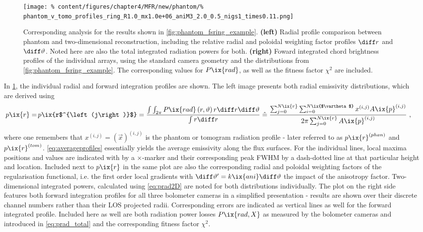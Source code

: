 %
           \begin{figure}[t]%
               \centering%
               \texttt{[image: \%
                   content/figures/chapter4/MFR/new/phantom/\%
                   phantom\_v\_tomo\_profiles\_ring\_R1.0\_mx1.0e+06\_aniM3\_2.0\_0.5\_nigs1\_times0.11.png]}%
               \caption{Corresponding analysis for the results shown in \cref{fig:phantom_fsring_example}. \textbf{(left)} Radial profile comparison between phantom and two-dimensional reconstruction, including the relative radial and poloidal weighting factor profiles $\diff r$ and $\diff\vartheta$. Noted here are also the total integrated radiation powers for both. \textbf{(right)} Foward integrated chord brightness profiles of the individual arrays, using the standard camera geometry and the distributions from \cref{fig:phantom_fsring_example}. The corresponding values for $P\ix{rad}$, as well as the fitness factor $\chi^2$ are included.}\label{fig:phantom_fsring_example_profiles}%
           \end{figure}%
%
           In \cref{fig:phantom_fsring_example_profiles}, the individual radial and forward integration profiles are shown. The left image presents both radial emissivity distributions, which are derived using%
%
           \begin{align}%
                p\ix{r}=\,&p\ix{r$^{\left(j\right)}$}=%
                \frac{\int\int_{2\pi}P\ix{rad}\left(r,\vartheta\right)r\diff r\diff\vartheta}{\int r\diff r}%
                \mathrel{\hat{=}}%
                \frac{\sum_{j=0}^{N\ix{r}}\sum_{i=0}^{N\ix{$\vartheta$}}x^{\left(i,j\right)}A\ix{p}^{\left(i,j\right)}}{%
                    2\pi\sum_{j=0}^{N\ix{r}}A\ix{p}^{\left(i,j\right)}}\,\,,\label{eq:averageprofiles}%
           \end{align}%
%
           where one remembers that $x^{\left(i,j\right)}=\left(\vec{x}\right)^{\left(i,j\right)}$ is the phantom or tomogram radiation profile - later referred to as $p\ix{r}^{\left(phan\right)}$ and $p\ix{r}^{\left(tom\right)}$. \autoref{eq:averageprofiles} essentially yields the average emissivity along the flux surfaces. For the individual lines, local maxima positions and values are indicated with by a $\times$-marker and their corresponding peak FWHM by a dash-dotted line at that particular height and location. Included next to $p\ix{r}$ in the same plot are also the corresponding radial and poloidal weighting factors of the regularisation functional, i.e. the first order local gradients with $\diff\vartheta^{\prime}=k\ix{ani}\diff\vartheta$ the impact of the anisotropy factor. Two-dimensional integrated powers, calculated using \cref{eq:prad2D} are noted for both distributions individually. The plot on the right side features both forward integration profiles for all three bolometer cameras in a simplified presentation - results are shown over their discrete channel numbers rather than their LOS projected radii. Corresponding errors are indicated as vertical lines as well for the forward integrated profile. Included here as well are both radiation power losses $P\ix{rad,X}$ as measured by the bolometer cameras and introduced in \cref{eq:prad_total} and the corresponding fitness factor $\chi^{2}$.\\%

